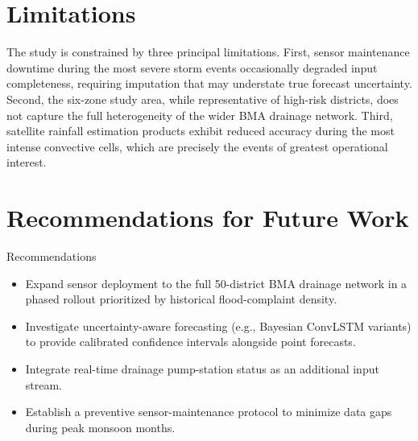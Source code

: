 \documentclass[12pt,a4paper]{report}
\begin{document}
\section{Limitations}
The study is constrained by three principal limitations. First, sensor maintenance downtime during the most severe storm events occasionally degraded input completeness, requiring imputation that may understate true forecast uncertainty. Second, the six-zone study area, while representative of high-risk districts, does not capture the full heterogeneity of the wider BMA drainage network. Third, satellite rainfall estimation products exhibit reduced accuracy during the most intense convective cells, which are precisely the events of greatest operational interest.

\section{Recommendations for Future Work}
\begin{chulabox}{Recommendations}
\begin{itemize}[leftmargin=1.4em]
  \item Expand sensor deployment to the full 50-district BMA drainage network in a phased rollout prioritized by historical flood-complaint density.
  \item Investigate uncertainty-aware forecasting (e.g., Bayesian ConvLSTM variants) to provide calibrated confidence intervals alongside point forecasts.
  \item Integrate real-time drainage pump-station status as an additional input stream.
  \item Establish a preventive sensor-maintenance protocol to minimize data gaps during peak monsoon months.
\end{itemize}
\end{chulabox}
\end{document}
